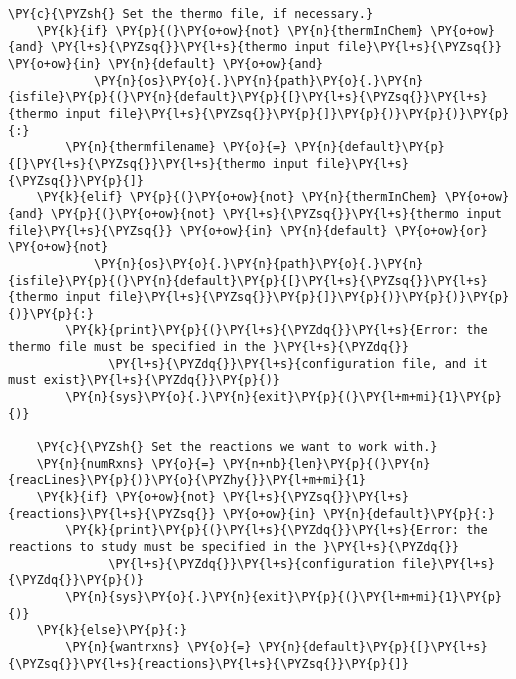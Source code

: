 \begin{Verbatim}[commandchars=\\\{\}]
    \PY{c}{\PYZsh{} Set the thermo file, if necessary.}
    \PY{k}{if} \PY{p}{(}\PY{o+ow}{not} \PY{n}{thermInChem} \PY{o+ow}{and} \PY{l+s}{\PYZsq{}}\PY{l+s}{thermo input file}\PY{l+s}{\PYZsq{}} \PY{o+ow}{in} \PY{n}{default} \PY{o+ow}{and}
            \PY{n}{os}\PY{o}{.}\PY{n}{path}\PY{o}{.}\PY{n}{isfile}\PY{p}{(}\PY{n}{default}\PY{p}{[}\PY{l+s}{\PYZsq{}}\PY{l+s}{thermo input file}\PY{l+s}{\PYZsq{}}\PY{p}{]}\PY{p}{)}\PY{p}{)}\PY{p}{:}
        \PY{n}{thermfilename} \PY{o}{=} \PY{n}{default}\PY{p}{[}\PY{l+s}{\PYZsq{}}\PY{l+s}{thermo input file}\PY{l+s}{\PYZsq{}}\PY{p}{]}
    \PY{k}{elif} \PY{p}{(}\PY{o+ow}{not} \PY{n}{thermInChem} \PY{o+ow}{and} \PY{p}{(}\PY{o+ow}{not} \PY{l+s}{\PYZsq{}}\PY{l+s}{thermo input file}\PY{l+s}{\PYZsq{}} \PY{o+ow}{in} \PY{n}{default} \PY{o+ow}{or} \PY{o+ow}{not}
            \PY{n}{os}\PY{o}{.}\PY{n}{path}\PY{o}{.}\PY{n}{isfile}\PY{p}{(}\PY{n}{default}\PY{p}{[}\PY{l+s}{\PYZsq{}}\PY{l+s}{thermo input file}\PY{l+s}{\PYZsq{}}\PY{p}{]}\PY{p}{)}\PY{p}{)}\PY{p}{)}\PY{p}{:}
        \PY{k}{print}\PY{p}{(}\PY{l+s}{\PYZdq{}}\PY{l+s}{Error: the thermo file must be specified in the }\PY{l+s}{\PYZdq{}}
              \PY{l+s}{\PYZdq{}}\PY{l+s}{configuration file, and it must exist}\PY{l+s}{\PYZdq{}}\PY{p}{)}
        \PY{n}{sys}\PY{o}{.}\PY{n}{exit}\PY{p}{(}\PY{l+m+mi}{1}\PY{p}{)}

    \PY{c}{\PYZsh{} Set the reactions we want to work with.}
    \PY{n}{numRxns} \PY{o}{=} \PY{n+nb}{len}\PY{p}{(}\PY{n}{reacLines}\PY{p}{)}\PY{o}{\PYZhy{}}\PY{l+m+mi}{1}
    \PY{k}{if} \PY{o+ow}{not} \PY{l+s}{\PYZsq{}}\PY{l+s}{reactions}\PY{l+s}{\PYZsq{}} \PY{o+ow}{in} \PY{n}{default}\PY{p}{:}
        \PY{k}{print}\PY{p}{(}\PY{l+s}{\PYZdq{}}\PY{l+s}{Error: the reactions to study must be specified in the }\PY{l+s}{\PYZdq{}}
              \PY{l+s}{\PYZdq{}}\PY{l+s}{configuration file}\PY{l+s}{\PYZdq{}}\PY{p}{)}
        \PY{n}{sys}\PY{o}{.}\PY{n}{exit}\PY{p}{(}\PY{l+m+mi}{1}\PY{p}{)}
    \PY{k}{else}\PY{p}{:}
        \PY{n}{wantrxns} \PY{o}{=} \PY{n}{default}\PY{p}{[}\PY{l+s}{\PYZsq{}}\PY{l+s}{reactions}\PY{l+s}{\PYZsq{}}\PY{p}{]}


\end{Verbatim}
